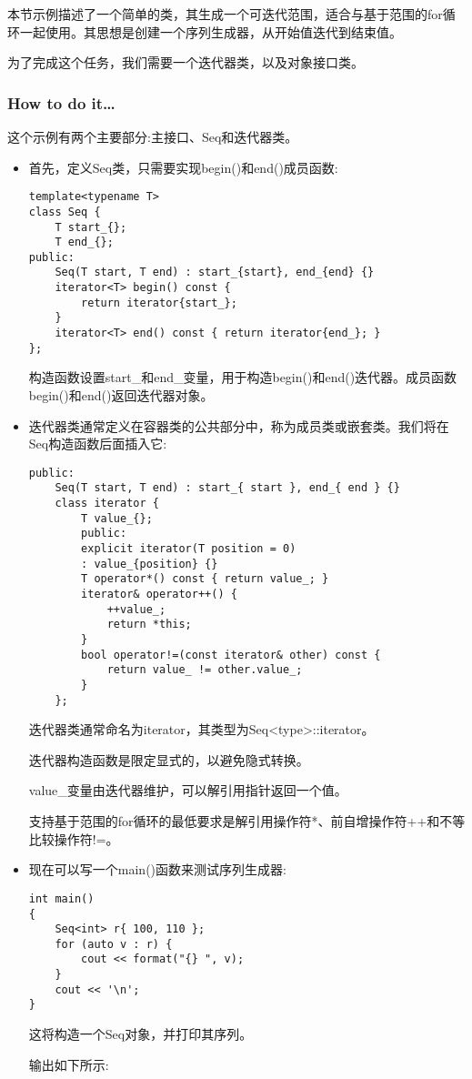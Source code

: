 
本节示例描述了一个简单的类，其生成一个可迭代范围，适合与基于范围的for循环一起使用。其思想是创建一个序列生成器，从开始值迭代到结束值。

为了完成这个任务，我们需要一个迭代器类，以及对象接口类。

\subsubsection{How to do it…}

这个示例有两个主要部分:主接口、Seq和迭代器类。

\begin{itemize}
\item 
首先，定义Seq类，只需要实现begin()和end()成员函数:

\begin{lstlisting}[style=styleCXX]
template<typename T>
class Seq {
	T start_{};
	T end_{};
public:
	Seq(T start, T end) : start_{start}, end_{end} {}
	iterator<T> begin() const {
		return iterator{start_};
	}
	iterator<T> end() const { return iterator{end_}; }
};
\end{lstlisting}

构造函数设置start\_和end\_变量，用于构造begin()和end()迭代器。成员函数begin()和end()返回迭代器对象。

\item 
迭代器类通常定义在容器类的公共部分中，称为成员类或嵌套类。我们将在Seq构造函数后面插入它:

\begin{lstlisting}[style=styleCXX]
public:
	Seq(T start, T end) : start_{ start }, end_{ end } {}
	class iterator {
		T value_{};
		public:
		explicit iterator(T position = 0)
		: value_{position} {}
		T operator*() const { return value_; }
		iterator& operator++() {
			++value_;
			return *this;
		}
		bool operator!=(const iterator& other) const {
			return value_ != other.value_;
		}
	};
\end{lstlisting}

迭代器类通常命名为iterator，其类型为Seq<type>::iterator。

迭代器构造函数是限定显式的，以避免隐式转换。

value\_变量由迭代器维护，可以解引用指针返回一个值。

支持基于范围的for循环的最低要求是解引用操作符*、前自增操作符++和不等比较操作符!=。

\item 
现在可以写一个main()函数来测试序列生成器:

\begin{lstlisting}[style=styleCXX]
int main()
{
	Seq<int> r{ 100, 110 };
	for (auto v : r) {
		cout << format("{} ", v);
	}
	cout << '\n';
}
\end{lstlisting}

这将构造一个Seq对象，并打印其序列。

输出如下所示:


\end{itemize}

